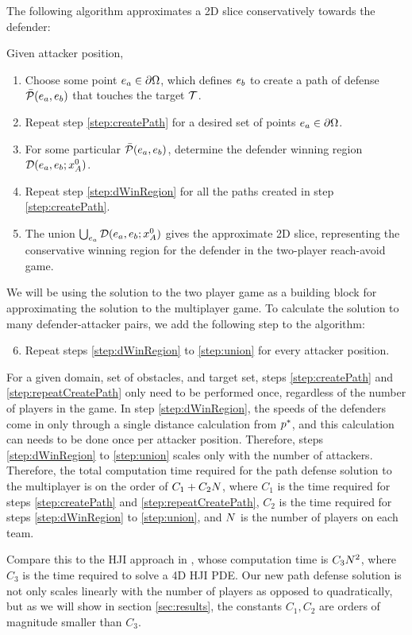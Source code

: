 The following algorithm approximates a 2D slice conservatively towards the defender:

Given attacker position,
\begin{enumerate}
\item Choose some point $e_a\in\partial\Omega$, which defines $e_b$ to create a path of defense $\bar{\mathcal{P}}(e_a,e_b)$ that touches the target $\mathcal{T}$. \label{step:createPath}
\item Repeat step \ref{step:createPath} for a desired set of points $e_a\in\partial\Omega$. \label{step:repeatCreatePath}
\item For some particular $\bar{\mathcal{P}}(e_a,e_b)$, determine the defender winning region $\mathcal{D}(e_a,e_b;x_A^0)$.\label{step:dWinRegion}
\item Repeat step \ref{step:dWinRegion} for all the paths created in step \ref{step:createPath}.
\item The union $\bigcup_{e_a} \mathcal{D}(e_a,e_b;x_A^0)$ gives the approximate 2D slice, representing the conservative winning region for the defender in the two-player reach-avoid game. \label{step:union}
\end{enumerate}

We will be using the solution to the two player game as a building block for approximating the solution to the multiplayer game. To calculate the solution to many defender-attacker pairs, we add the following step to the algorithm: 
\begin{enumerate}
\setcounter{enumi}{5}
\item Repeat steps \ref{step:dWinRegion} to \ref{step:union} for every attacker position.
\end{enumerate}

For a given domain, set of obstacles, and target set, steps \ref{step:createPath} and \ref{step:repeatCreatePath} only need to be performed once, regardless of the number of players in the game. In step \ref{step:dWinRegion}, the speeds of the defenders come in only through a single distance calculation from $p^*$, and this calculation can needs to be done once per attacker position. Therefore, steps \ref{step:dWinRegion} to \ref{step:union} scales only with the number of attackers. Therefore, the total computation time required for the path defense solution to the multiplayer is on the order of $C_1 + C_2 N$, where $C_1$ is the time required for steps \ref{step:createPath} and \ref{step:repeatCreatePath}, $C_2$ is the time required for steps \ref{step:dWinRegion} to \ref{step:union}, and $N$ is the number of players on each team. 

Compare this to the HJI approach in \cite{Chen2014}, whose computation time is $C_3 N^2$, where $C_3$ is the time required to solve a 4D HJI PDE. Our new path defense solution is not only scales linearly with the number of players as opposed to quadratically, but as we will show in section \ref{sec:results}, the constants $C_1,C_2$ are orders of magnitude smaller than $C_3$.